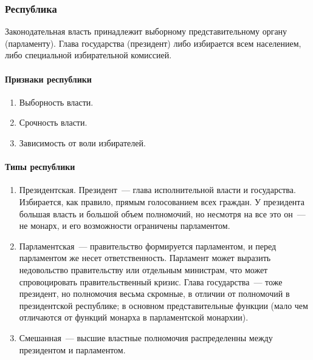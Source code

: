 \documentclass[12pt]{article}
\begin{document}
	\subsubsection{Республика}
	\begin{definition}[Республика]
		Законодательная власть принадлежит выборному представительному органу (парламенту). Глава государства (президент) либо избирается всем населением, либо специальной избирательной комиссией.
	\end{definition}
	\paragraph{Признаки республики}
	\begin{enumerate}
		\item Выборность власти.
		\item Срочность власти.
		\item Зависимость от воли избирателей.
	\end{enumerate}
	\paragraph{Типы республики}
	\begin{enumerate}
		\item Президентская. Президент~--- глава исполнительной власти и государства. Избирается, как правило, прямым голосованием всех граждан. У президента большая власть и большой объем полномочий, но несмотря на все это он~--- не монарх, и его возможности ограничены парламентом.
		\item Парламентская~--- правительство формируется парламентом, и перед парламентом же несет ответственность. Парламент может выразить недовольство правительству или отдельным министрам, что может спровоцировать правительственный кризис. Глава государства~--- тоже президент, но полномочия весьма скромные, в отличии от полномочий в президентской республике; в основном представительные функции (мало чем отличаются от функций монарха в парламентской монархии).
		\item Смешанная~--- высшие властные полномочия распределенны между президентом и парламентом.
	\end{enumerate}
\end{document}
